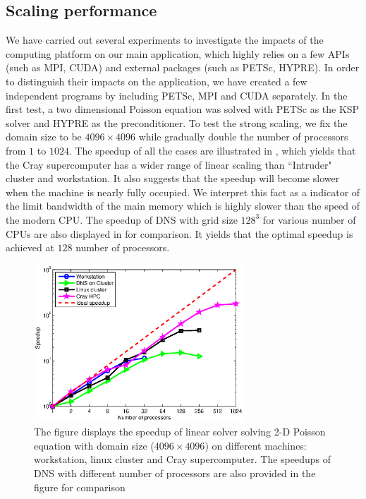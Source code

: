 \subsection{Scaling performance}
We have carried out several experiments to investigate the impacts of the
computing platform on our main application, which highly relies on a
few APIs (such as MPI, CUDA) and external packages (such as
PETSc, HYPRE).  In order to distinguish their impacts on the application, we have
created a few independent programs by including PETSc, MPI and CUDA separately.
In the first test, a two dimensional Poisson equation was solved with PETSc as
the KSP solver and HYPRE as the preconditioner. To test the strong scaling, we
fix the domain size to be $4096\times 4096$ while gradually double the number
of processors from $1$ to $1024$. The speedup of all the cases are illustrated in , 
which yields that the Cray supercomputer has a wider range of linear scaling than ``Intruder" cluster
and workstation. It also suggests that the speedup will become slower
when the machine is nearly fully occupied. We interpret this fact as a
indicator of the limit bandwidth of the main memory which is highly slower than
the speed of the modern CPU. The speedup of DNS with grid size $128^3$ for various 
number of CPUs are also displayed in  for comparison. It yields 
that the optimal speedup is achieved at $128$ number of processors.  

\begin{figure}[!htbp]\center
\includegraphics[width=0.7\textwidth]{Figures/petsc_scaling}
\caption{The figure displays the speedup of linear solver solving 2-D Poisson equation with domain size ($4096\times 4096$) on different machines: workstation, linux cluster and Cray supercomputer. The speedups of DNS with different number of processors are also provided in the figure for comparison\label{petsc_speedup}}
\end{figure}

